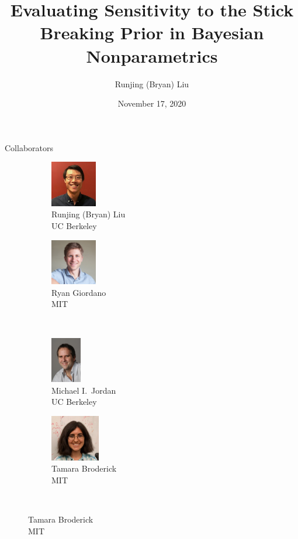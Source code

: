 \documentclass[10pt]{beamer}\usepackage[]{graphicx}\usepackage[]{color}
\title{Evaluating Sensitivity to the Stick Breaking Prior in
Bayesian Nonparametrics}
\date{November 17, 2020}
\author{Runjing (Bryan) Liu}
\institute{University of California, Berkeley}
\begin{document}
\maketitle

\begin{frame}{Collaborators}
  	\vspace{1em}
  	\begin{figure}
  		\begin{subfigure}{.4\textwidth}
  			\centering
  			\includegraphics[height=2cm]{collaborators/bryan}
        \captionsetup{justification=centering}
  			\caption*{Runjing (Bryan) Liu \\ UC Berkeley}
  		\end{subfigure}%
  		\begin{subfigure}{.4\textwidth}
  			\centering
  			\includegraphics[height=2cm]{collaborators/ryan}
  			\caption*{Ryan Giordano \\ MIT}
  		\end{subfigure}\\ \vspace{0.11in}
      \begin{subfigure}{.4\textwidth}
  			\centering
  			\includegraphics[height=2cm]{collaborators/mike}
  			\caption*{Michael I.\ Jordan \\ UC Berkeley}
  		\end{subfigure}%
  		\begin{subfigure}{.4\textwidth}
  			\centering
  			\includegraphics[height=2cm]{collaborators/tamara}
  			\caption*{Tamara Broderick \\ MIT}
  		\end{subfigure}\\
  	\end{figure}

\end{frame}
\end{document}
